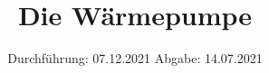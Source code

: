 

\subject{V206}
\title{Die Wärmepumpe}
\date{%
  Durchführung: 07.12.2021
  \hspace{3em}
  Abgabe: 14.07.2021
}



\maketitle
\thispagestyle{empty}
\tableofcontents
\newpage






\printbibliography{}




